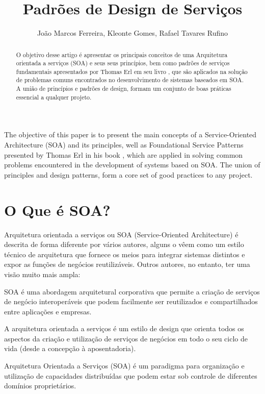 \documentclass[12pt]{article}
\title{Padrões de Design de Serviços}
\author{João Marcos Ferreira\inst{1}, Kleonte Gomes\inst{2}, Rafael Tavares Rufino\inst{3} }
\begin{document}
 

\maketitle

\begin{abstract}
O objetivo desse artigo é apresentar os principais conceitos de uma Arquitetura orientada a serviços (SOA) e seus seus princípios, bem como padrões de serviços fundamentais apresentados por Thomas Erl em seu livro \cite{erl_padroes}, que são aplicados na solução de problemas comuns encontrados no desenvolvimento de sistemas baseados em SOA. A união de princípios e padrões de design, formam um conjunto de boas práticas essencial a qualquer projeto.   
\end{abstract}
   
\begin{resumo} 
The objective of this paper is to present the main concepts of a Service-Oriented Architecture (SOA) and its principles, well as Foundational Service Patterns presented by Thomas Erl in his book \cite{erl_padroes}, which are applied in solving common problems encountered in the development of systems based on SOA. The union of principles and design patterns, form a core set of good practices to any project.
\end{resumo}


\section{O Que é SOA?}

Arquitetura orientada a serviços ou SOA (Service-Oriented Architecture) é descrita de forma diferente por vários autores, alguns o vêem como um estilo técnico de arquitetura que fornece os meios para integrar sistemas distintos e expor as funções de negócios reutilizáveis. Outros autores, no entanto, ter uma visão muito mais ampla:

SOA é uma abordagem arquitetural corporativa que permite a criação de serviços de negócio interoperáveis que podem facilmente ser reutilizados e compartilhados entre aplicações e empresas.

A arquitetura orientada a serviços é um estilo de design que orienta todos os aspectos da criação e utilização de serviços de negócios em todo o seu ciclo de vida (desde a concepção à aposentadoria). \cite{newcomer}

Arquitetura Orientada a Serviços (SOA) é um paradigma para organização e utilização de capacidades distribuídas que podem estar sob controle de diferentes domínios proprietários. \cite{oasis}
\end{document}
